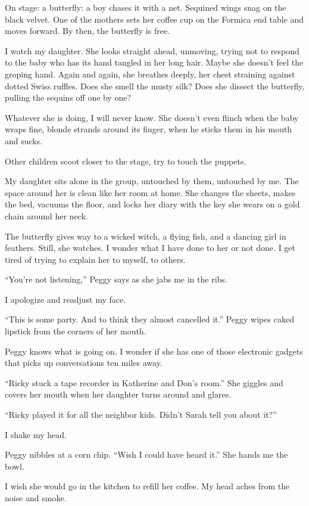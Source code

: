 \documentclass[
]{article}
\begin{document}
On stage: a butterfly: a boy chases it with a net. Sequined wings snag
on the black velvet. One of the mothers sets her coffee cup on the
Formica end table and moves forward. By then, the butterfly is free.

I watch my daughter. She looks straight ahead, unmoving, trying not to
respond to the baby who has its hand tangled in her long hair. Maybe she
doesn't feel the groping hand. Again and again, she breathes deeply, her
chest straining against dotted Swiss ruffles. Does she smell the musty
silk? Does she dissect the butterfly, pulling the sequins off one by
one?

Whatever she is doing, I will never know. She doesn't even flinch when
the baby wraps fine, blonde strands around its finger, when he sticks
them in his mouth and sucks.

Other children scoot closer to the stage, try to touch the puppets.

My daughter sits alone in the group, untouched by them, untouched by me.
The space around her is clean like her room at home. She changes the
sheets, makes the bed, vacuums the floor, and locks her diary with the
key she wears on a gold chain around her neck.

The butterfly gives way to a wicked witch, a flying fish, and a dancing
girl in feathers. Still, she watches. I wonder what I have done to her
or not done. I get tired of trying to explain her to myself, to others.

``You're not listening,'' Peggy says as she jabs me in the ribs.

I apologize and readjust my face.

``This is some party. And to think they almost cancelled it.'' Peggy
wipes caked lipstick from the corners of her mouth.

Peggy knows what is going on. I wonder if she has one of those
electronic gadgets that picks up conversations ten miles away.

``Ricky stuck a tape recorder in Katherine and Don's room.'' She giggles
and covers her mouth when her daughter turns around and glares.

``Ricky played it for all the neighbor kids. Didn't Sarah tell you about
it?''

I shake my head.

Peggy nibbles at a corn chip. ``Wish I could have heard it.'' She hands
me the bowl.

I wish she would go in the kitchen to refill her coffee. My head aches
from the noise and smoke.
\end{document}
